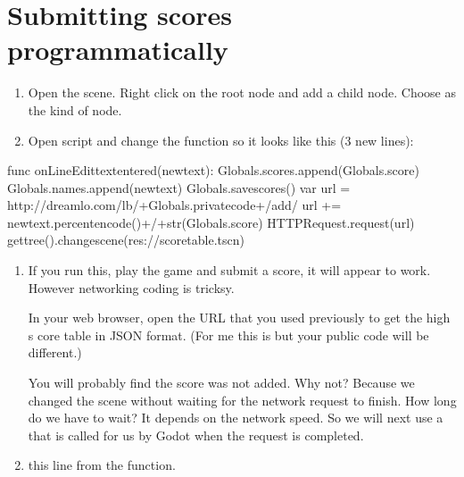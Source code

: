 \documentclass[a4paper,12pt,english]{sphinxmanual}
\begin{document}
\section{Submitting scores programmatically}
\label{\detokenize{tutorial:submitting-scores-programmatically}}\begin{enumerate}
%
\item {} 
\sphinxAtStartPar
Open the  scene. Right click on the root node and
add a child node. Choose  as the kind of node.

\item {} 
\sphinxAtStartPar
Open  script and change the
 function so it looks like this (3 new
lines):

\end{enumerate}

\begin{sphinxVerbatim}[commandchars=\\\{\}]
func \PYGZus{}on\PYGZus{}LineEdit\PYGZus{}text\PYGZus{}entered(new\PYGZus{}text):
    Globals.scores.append(Globals.score)
    Globals.names.append(new\PYGZus{}text)
    Globals.save\PYGZus{}scores()
    var url = \PYGZdq{}http://dreamlo.com/lb/\PYGZdq{}+Globals.private\PYGZus{}code+\PYGZdq{}/add/\PYGZdq{}
    url += new\PYGZus{}text.percent\PYGZus{}encode()+\PYGZdq{}/\PYGZdq{}+str(Globals.score)
    \PYGZdl{}HTTPRequest.request(url)
    get\PYGZus{}tree().change\PYGZus{}scene(\PYGZdq{}res://score\PYGZus{}table.tscn\PYGZdq{})
\end{sphinxVerbatim}
\begin{enumerate}
%
\setcounter{enumi}{2}
\item {} 
\sphinxAtStartPar
If you run this, play the game and submit a score, it will appear to
work. However networking coding is tricksy.

\sphinxAtStartPar
In your web browser, open the URL that you used previously to get the
high s core table in JSON format. (For me this is
 but your public
code will be different.)

\sphinxAtStartPar
You will probably find the score was not added. Why not? Because we
changed the scene without waiting for the network request to finish.
How long do we have to wait? It depends on the network speed. So we
will next use a  that is called for us by Godot
when the request is completed.

\item {} 
\sphinxAtStartPar
{} this line from the  function.

\end{enumerate}
\end{document}
